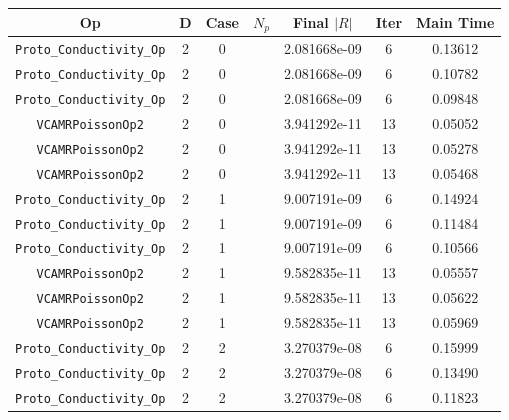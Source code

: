 \documentclass{article}
\begin{document}
\begin{small}
\begin{table}
\begin{center}
\begin{tabular}{|c|c|c|c|c|c||c|} \hline
 Op & D & Case & $N_p$ & Final $|R|$  &  Iter & Main Time \\
\hline
 {\tt Proto\_Conductivity\_Op}      & 2 & 0 &    & 2.081668e-09   & 6       & 0.13612    \\
 {\tt Proto\_Conductivity\_Op}      & 2 & 0 &    & 2.081668e-09   & 6       & 0.10782    \\
 {\tt Proto\_Conductivity\_Op}      & 2 & 0 &    & 2.081668e-09   & 6       & 0.09848    \\
\hline                                                                              
 {\tt VCAMRPoissonOp2}              & 2 & 0 &    & 3.941292e-11   & 13      & 0.05052    \\
 {\tt VCAMRPoissonOp2}              & 2 & 0 &    & 3.941292e-11   & 13      & 0.05278    \\
 {\tt VCAMRPoissonOp2}              & 2 & 0 &    & 3.941292e-11   & 13      & 0.05468    \\
\hline
 {\tt Proto\_Conductivity\_Op}      & 2 & 1 &    & 9.007191e-09   & 6       & 0.14924    \\
 {\tt Proto\_Conductivity\_Op}      & 2 & 1 &    & 9.007191e-09   & 6       & 0.11484    \\
 {\tt Proto\_Conductivity\_Op}      & 2 & 1 &    & 9.007191e-09   & 6       & 0.10566    \\
\hline                                                                             
 {\tt VCAMRPoissonOp2}              & 2 & 1 &    & 9.582835e-11   & 13      & 0.05557    \\
 {\tt VCAMRPoissonOp2}              & 2 & 1 &    & 9.582835e-11   & 13      & 0.05622    \\
 {\tt VCAMRPoissonOp2}              & 2 & 1 &    & 9.582835e-11   & 13      & 0.05969    \\
\hline
 {\tt Proto\_Conductivity\_Op}      & 2 & 2 &    & 3.270379e-08   & 6       & 0.15999    \\
 {\tt Proto\_Conductivity\_Op}      & 2 & 2 &    & 3.270379e-08   & 6       & 0.13490    \\
 {\tt Proto\_Conductivity\_Op}      & 2 & 2 &    & 3.270379e-08   & 6       & 0.11823    \\
\hline                                                                            

\end{tabular}
\end{center}
\end{table}
\end{small}
\end{document}

